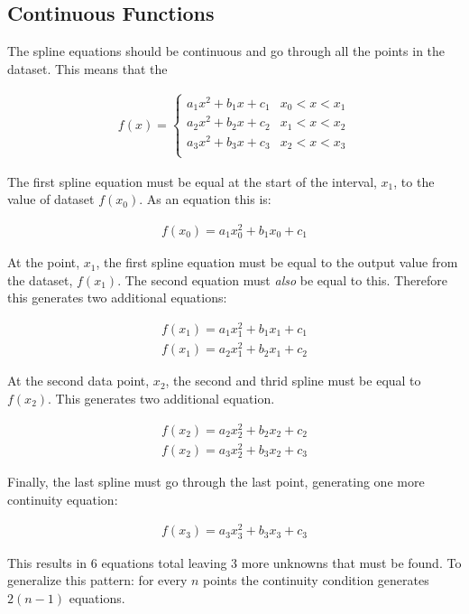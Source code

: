 \subsection{Continuous Functions}
The spline equations should be continuous and go through all the points in the dataset. This means that the 

\begin{align}
f(x)
=
\begin{cases}
a_1x^2 + b_1x + c_1 & x_0 < x < x_1\\
a_2x^2 + b_2x + c_2 & x_1 < x < x_2\\
a_3x^2 + b_3x + c_3 & x_2 < x < x_3\\
\end{cases}
\end{align}

The first spline equation must be equal at the start of the interval, $x_1$, to the value of dataset $f(x_0)$. As an equation this is:

\begin{align}
f(x_0) = a_1x_0^2 + b_1x_0 + c_1
\end{align}

At the point, $x_1$, the first spline equation must be equal to the output value from the dataset, $f(x_1)$. The second equation must \textit{also} be equal to this. Therefore this generates two additional equations:

\begin{align}
f(x_1) = a_1x_1^2 + b_1x_1 + c_1 \\
f(x_1) = a_2x_1^2 + b_2x_1 + c_2
\end{align}

At the second data point, $x_2$, the second and thrid spline must be equal to $f(x_2)$. This generates two additional equation.

\begin{align}
f(x_2) = a_2x_2^2 + b_2x_2 + c_2 \\
f(x_2) = a_3x_2^2 + b_3x_2 + c_3
\end{align}

Finally, the last spline must go through the last point, generating one more continuity equation:

\begin{align}
f(x_3) = a_3x_3^2 + b_3x_3 + c_3
\end{align}

This results in $6$ equations total leaving $3$ more unknowns that must be found. To generalize this pattern: for every $n$ points the continuity condition generates $2(n-1)$ equations.

